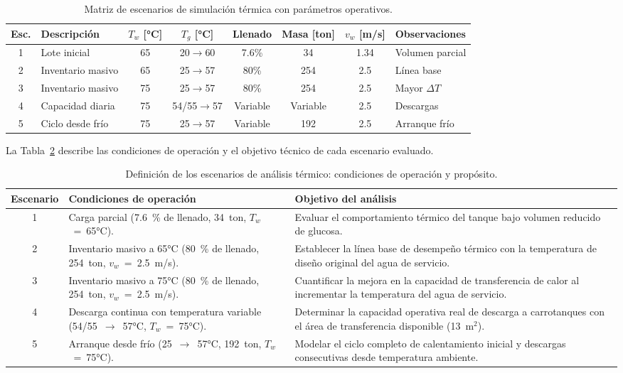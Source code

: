 \begin{table}[H]
\centering
\caption{Matriz de escenarios de simulación térmica con parámetros operativos.}
\label{tab:resumen_escenarios_detallado}
\setcounter{itemcount}{0}
\scriptsize
\begin{tabularx}{\textwidth}{@{}clcccccX@{}}
\toprule
\textbf{Esc.} & \textbf{Descripción} & \textbf{$T_{w}$ [°C]} & \textbf{$T_{g}$ [°C]} & \textbf{Llenado} & \textbf{Masa [ton]} & \textbf{$v_w$ [m/s]} & \textbf{Observaciones} \\
\midrule
1 & Lote inicial & 65 & 20$\rightarrow$60 & 7.6\% & 34 & 1.34 & Volumen parcial \\
2 & Inventario masivo & 65 & 25$\rightarrow$57 & 80\% & 254 & 2.5 & Línea base \\
3 & Inventario masivo & 75 & 25$\rightarrow$57 & 80\% & 254 & 2.5 & Mayor $\Delta T$ \\
4 & Capacidad diaria & 75 & 54/55$\rightarrow$57 & Variable & Variable & 2.5 & Descargas \\
5 & Ciclo desde frío & 75 & 25$\rightarrow$57 & Variable & 192 & 2.5 & Arranque frío \\
\bottomrule
\end{tabularx}
\end{table}

La Tabla~\ref{tab:resumen_proposito_escenarios} describe las condiciones de operación y el objetivo técnico de cada escenario evaluado.

\begin{table}[H]
\centering
\caption{Definición de los escenarios de análisis térmico: condiciones de operación y propósito.}
\label{tab:resumen_proposito_escenarios}
\setcounter{itemcount}{0}
\footnotesize
\begin{tabularx}{\textwidth}{@{}clX@{}}
\toprule
\textbf{Escenario} & \textbf{Condiciones de operación} & \textbf{Objetivo del análisis} \\
\midrule
1 & Carga parcial (7.6\ \% de llenado, 34~ton, $T_w$~=~65°C). & Evaluar el comportamiento térmico del tanque bajo volumen reducido de glucosa. \\
2 & Inventario masivo a 65°C (80\ \% de llenado, 254~ton, $v_w$~=~2.5~m/s). & Establecer la línea base de desempeño térmico con la temperatura de diseño original del agua de servicio. \\
3 & Inventario masivo a 75°C (80\ \% de llenado, 254~ton, $v_w$~=~2.5~m/s). & Cuantificar la mejora en la capacidad de transferencia de calor al incrementar la temperatura del agua de servicio. \\
4 & Descarga continua con temperatura variable (54/55~$\rightarrow$~57°C, $T_w$~=~75°C). & Determinar la capacidad operativa real de descarga a carrotanques con el área de transferencia disponible (13~m$^2$). \\
5 & Arranque desde frío (25~$\rightarrow$~57°C, 192~ton, $T_w$~=~75°C). & Modelar el ciclo completo de calentamiento inicial y descargas consecutivas desde temperatura ambiente. \\
\bottomrule
\end{tabularx}
\end{table}

